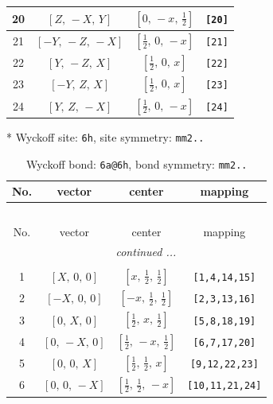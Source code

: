 \documentclass[fleqn,8pt]{jsarticle}
\begin{document}
\begin{longtable}{cccc}
20 & $\left[ Z,\, - X,\, Y \right]$ & $\left[ 0,\, - x,\, \frac{1}{2} \right]$ & {\tt [20]} \\ \hline
21 & $\left[ - Y,\, - Z,\, - X \right]$ & $\left[ \frac{1}{2},\, 0,\, - x \right]$ & {\tt [21]} \\ \hline
22 & $\left[ Y,\, - Z,\, X \right]$ & $\left[ \frac{1}{2},\, 0,\, x \right]$ & {\tt [22]} \\ \hline
23 & $\left[ - Y,\, Z,\, X \right]$ & $\left[ \frac{1}{2},\, 0,\, x \right]$ & {\tt [23]} \\ \hline
24 & $\left[ Y,\, Z,\, - X \right]$ & $\left[ \frac{1}{2},\, 0,\, - x \right]$ & {\tt [24]} \\
\end{longtable}
* Wyckoff site: {\tt 6h}, site symmetry: {\tt mm2..}
\renewcommand{\arraystretch}{1.2}
\begin{longtable}{cccc}
\caption{Wyckoff bond: {\tt 6a@6h}, bond symmetry: {\tt mm2..}}
 \\
 \hline \hline
No. & vector & center & mapping \\ \hline \endfirsthead

\multicolumn{3}{l}{\tablename\ \thetable{}} \\
 \hline \hline
No. & vector & center & mapping \\ \hline \endhead

 \hline \hline
\multicolumn{3}{r}{\footnotesize\it continued ...} \\ \endfoot

 \hline \hline
\multicolumn{3}{r}{} \\ \endlastfoot

1 & $\left[ X,\, 0,\, 0 \right]$ & $\left[ x,\, \frac{1}{2},\, \frac{1}{2} \right]$ & {\tt [1,4,14,15]} \\ \hline
2 & $\left[ - X,\, 0,\, 0 \right]$ & $\left[ - x,\, \frac{1}{2},\, \frac{1}{2} \right]$ & {\tt [2,3,13,16]} \\ \hline
3 & $\left[ 0,\, X,\, 0 \right]$ & $\left[ \frac{1}{2},\, x,\, \frac{1}{2} \right]$ & {\tt [5,8,18,19]} \\ \hline
4 & $\left[ 0,\, - X,\, 0 \right]$ & $\left[ \frac{1}{2},\, - x,\, \frac{1}{2} \right]$ & {\tt [6,7,17,20]} \\ \hline
5 & $\left[ 0,\, 0,\, X \right]$ & $\left[ \frac{1}{2},\, \frac{1}{2},\, x \right]$ & {\tt [9,12,22,23]} \\ \hline
6 & $\left[ 0,\, 0,\, - X \right]$ & $\left[ \frac{1}{2},\, \frac{1}{2},\, - x \right]$ & {\tt [10,11,21,24]} \\
\end{longtable}
\end{document}
